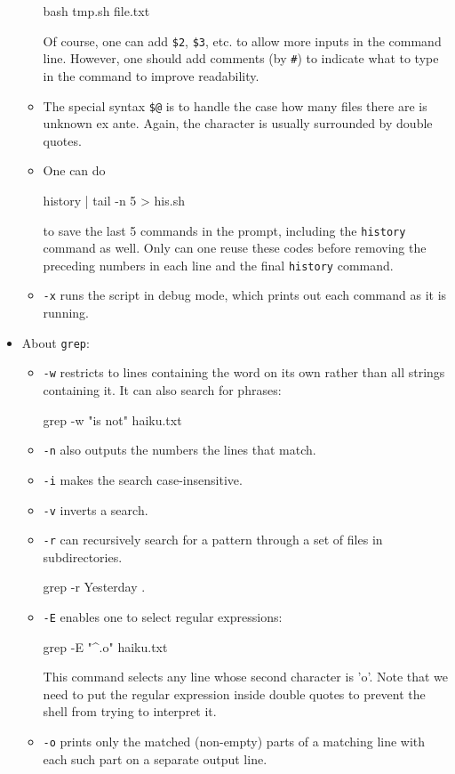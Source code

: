 \documentclass[UTF8]{book}
\newcommand{\code}[1]{\colorbox{codegray}{\texttt{#1}}}
\begin{document}
\begin{itemize}
\begin{itemize}
	\begin{bash}
bash tmp.sh file.txt
	\end{bash}
	Of course, one can add \code{\$2}, \code{\$3}, etc. to allow more inputs in the command line. However, one should add comments (by \code{\#}) to indicate what to type in the command to improve readability.
	\item The special syntax \code{\$@} is to handle the case how many files there are is unknown ex ante. Again, the character is usually surrounded by double quotes.
	\item One can do
	\begin{bash}
history | tail -n 5 > his.sh
	\end{bash}
	to save the last 5 commands in the prompt, including the \code{history} command as well. Only can one reuse these codes before removing the preceding numbers in each line and the final \code{history} command.
	\item \code{-x} runs the script in debug mode, which prints out each command as it is running.
\end{itemize}
\item About \code{grep}:
\begin{itemize}
	\item \code{-w} restricts to lines containing the word on its own rather than all strings containing it. It can also search for phrases:
	\begin{bash}
grep -w "is not" haiku.txt
	\end{bash}
	\item \code{-n} also outputs the numbers the lines that match.
	\item \code{-i} makes the search case-insensitive.
	\item \code{-v} inverts a search.
	\item \code{-r} can recursively search for a pattern through a set of files in subdirectories.
	\begin{bash}
grep -r Yesterday .
	\end{bash}
	\item \code{-E} enables one to select regular expressions:
	\begin{bash}
grep -E "^.o" haiku.txt
	\end{bash}
	This command selects any line whose second character is 'o'. Note that we need to put the regular expression inside double quotes to prevent the shell from trying to interpret it.
	\item \code{-o} prints only the matched (non-empty) parts of a matching line with each such part on a separate output line.

\end{itemize}
\end{itemize}
\end{document}
